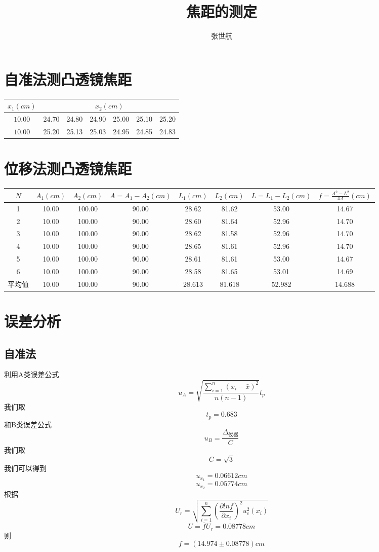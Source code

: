 \documentclass[10pt, a4paper]{article}
\title{焦距的测定}
\author{张世航}
\begin{document}
	\maketitle
	\section{自准法测凸透镜焦距}
	\begin{tabular}{|c|c|c|c|c|c|c|}
		\hline
		$x_1(cm)$& \multicolumn{6}{|c|}{$x_2(cm)$}\\
		\hline
		$10.00$& 24.70 & 24.80 & 24.90 & 25.00 & 25.10 & 25.20   \\
		\hline
		$10.00$& 25.20 & 25.13 & 25.03 & 24.95 & 24.85 & 24.83   \\
		\hline
	\end{tabular}
	
	\section{位移法测凸透镜焦距}
	\begin{tabular}{|c|c|c|c|c|c|c|c|}
		\hline
		$N$& $A_1(cm)$ & $A_2(cm)$ & $A=A_1-A_2(cm)$ & $L_1(cm)$ & $L_2(cm)$ & $L=L_1-L_2(cm)$ &$f=\frac{A^2-L^2}{4A}(cm)$  \\
		\hline
		1& 10.00 & 100.00 & 90.00 & 28.62 & 81.62 & 53.00 & 14.67 \\
		\hline
		2& 10.00 & 100.00 & 90.00 & 28.60 & 81.64 & 52.96 & 14.70 \\
		\hline
		3& 10.00 & 100.00 & 90.00 & 28.62 & 81.58 & 52.96 & 14.70 \\
		\hline
		4& 10.00 & 100.00 & 90.00 & 28.65 & 81.61 & 52.96 & 14.70 \\
		\hline
		5& 10.00 & 100.00 & 90.00 & 28.61 & 81.61 & 53.00 & 14.67 \\
		\hline
		6& 10.00 & 100.00 & 90.00 & 28.58 & 81.65 & 53.01 & 14.69 \\
		\hline
		平均值&10.00&100.00&90.00&28.613&81.618&52.982&14.688\\
		\hline
	\end{tabular}
	
	\section{误差分析}
	\subsection{自准法}
	利用A类误差公式\[u_A = \sqrt{\frac{\sum_{i=1}^n(x_i-\bar{x})^2}{n(n-1)}}t_p\]
	我们取\[t_p = 0.683\]
	和B类误差公式
	\[u_B = \frac{\Delta_{\text{仪器}}}{C}\]
	我们取\[C = \sqrt{3}\]
	我们可以得到
	\[u_{x_1} = 0.06612cm\]
	\[u_{x_2} = 0.05774cm\]
		根据
	\[U_r = \sqrt{\sum_{i=1}^n(\frac{\partial lnf}{\partial x_i})^2u_c^2(x_i)}\]
	\[U = \bar{f}U_r = 0.08778cm\]
	则\[f = (14.974\pm0.08778)cm\]
\end{document}
